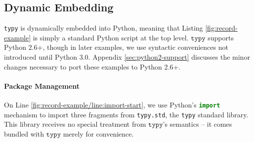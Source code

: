 \documentclass[preprint,10pt]{sigplanconf}
\newcommand{\typy}{\texttt{typy}}
\newcommand{\lip}[1]{\lstinline[language=Python,basicstyle=\ttfamily\footnotesize,deletendkeywords={tuple,buffer,map}]{#1}}
\begin{document}
\subsection{Dynamic Embedding} 
\texttt{typy} is dynamically embedded into Python, meaning that Listing \ref{fig:record-example} is simply a standard Python script at the top level. $\typy$ supports Python 2.6+, though in later examples, we use syntactic conveniences not introduced until Python 3.0. Appendix \ref{sec:python2-support} discusses the minor changes necessary to port these examples to Python 2.6+.%


\paragraph{Package Management} On Line \ref{fig:record-example/line:import-start}, we use Python's \lip{import} mechanism to import three fragments from \texttt{typy.std}, the \verb|typy| standard library. This library receives no special treatment from $\typy$'s semantics -- it comes bundled with $\typy$ merely for convenience.
\end{document}
